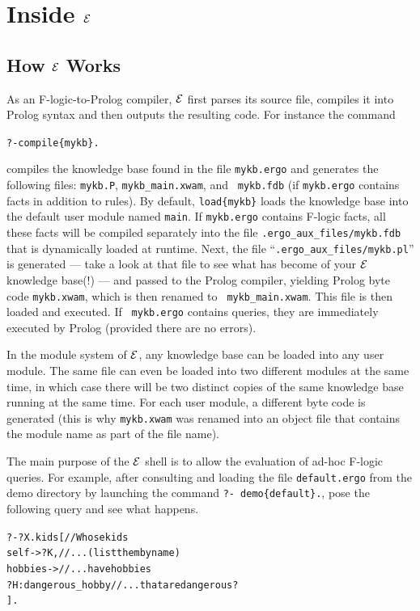 \documentclass[11pt]{article}
\newcommand{\ERGO}{\mbox{\ensuremath{\cal{E}}\smaller{{\sc{RGO}}}}\xspace}
\newcommand{\FLSYSTEM}{\ERGO}
\newcommand{\ergoext}{ergo\xspace}
\newcommand{\fl}{\mbox{F-logic}\xspace}
\newcommand{\ofile}{xwam}
\begin{document}
\newpage
\section{Inside \FLSYSTEM}

\subsection{How \FLSYSTEM Works}


As an \fl-to-Prolog compiler, \FLSYSTEM first parses its source file,
compiles it into Prolog syntax and then outputs the resulting code. For
instance the command 
\begin{alltt}
    ?- compile\{mykb\}.
\end{alltt}
compiles the knowledge base found in the file {\tt mykb.\ergoext} and generates the
following files: {\tt mykb.P}, {\tt mykb\_main.\ofile}, and {\tt
  mykb.fdb} (if {\tt mykb.\ergoext} contains facts in addition to rules).
By default, {\tt load\{mykb\}} loads the knowledge base into the default user
module named {\tt main}. If {\tt mykb.\ergoext} contains \fl facts, all these
facts will be compiled separately into the file {\tt .ergo\_aux\_files/mykb.fdb} that is
dynamically loaded at runtime.  Next, the file
``\texttt{.ergo\_aux\_files/mykb.pl}''  is generated
--- take a look at that file to see what has become of your
\FLSYSTEM knowledge base(!) --- and passed to the Prolog compiler, yielding Prolog byte
code {\tt mykb.\ofile}, which is then renamed to {\tt
  mykb\_main.\ofile}. This file is then loaded and executed.  If {\tt
  mykb.\ergoext} contains queries, they are immediately executed by Prolog
(provided there are no errors).

In the module system of \FLSYSTEM, any knowledge base can be loaded into any
user module. The same file can even be loaded into two different
modules at the same time, in which case there will be two distinct copies
of the same knowledge base running at the same time. For each user module, a different
byte code is generated (this is why {\tt mykb.\ofile} was renamed into an
object file that contains the module name as part of the file name).

The main purpose of the \FLSYSTEM shell is to allow the evaluation
of ad-hoc \fl queries. For example, after consulting and loading the
file \texttt{default.\ergoext} from the demo directory by launching
the command \texttt{?-~demo\{default\}.}, pose the following query
and see what happens.
\begin{alltt}
 \hspace*{4mm}   ?-  ?X.kids[                       // Whose kids
 \hspace*{15mm}           self -> ?K,             // ... (list them by name)
 \hspace*{15mm}           hobbies ->              // ... have hobbies
 \hspace*{15mm}             ?H:dangerous\_hobby    // ... that are dangerous? 
 \hspace*{10mm}           ]. 
\end{alltt}
\end{document}
